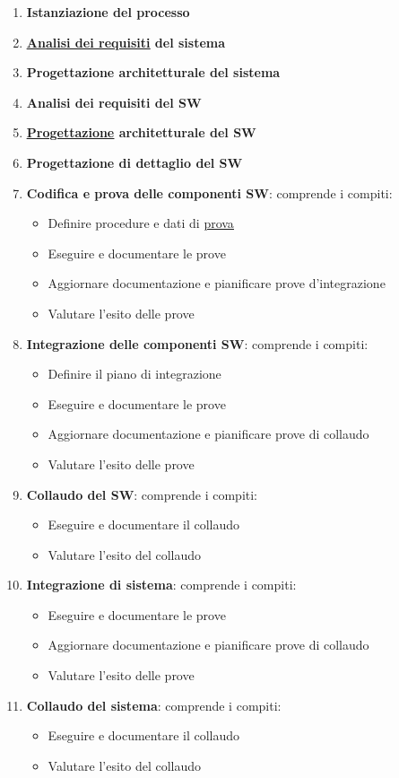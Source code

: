 			\begin{enumerate}
				\item \textbf{Istanziazione del processo}
				\item \textbf{\underline{\hyperref[analisideirequisiti]{Analisi dei requisiti}} del sistema}
				\item \textbf{Progettazione architetturale del sistema}
				\item \textbf{Analisi dei requisiti del SW}
				\item \textbf{\underline{\hyperref[progettazione]{Progettazione}} architetturale del SW}
				\item \textbf{Progettazione di dettaglio del SW}
				\item \textbf{Codifica e prova delle componenti SW}: comprende i compiti:
					\begin{itemize}
						\item Definire procedure e dati di \underline{\hyperref[prova]{prova}}
						\item Eseguire e documentare le prove
						\item Aggiornare documentazione e pianificare prove d’integrazione
						\item Valutare l’esito delle prove
					\end{itemize}
				\item \textbf{Integrazione delle componenti SW}: comprende i compiti:
					\begin{itemize}
						\item Definire il piano di integrazione
						\item Eseguire e documentare le prove
						\item Aggiornare documentazione e pianificare prove di collaudo
						\item Valutare l’esito delle prove
					\end{itemize}
				\item \textbf{Collaudo del SW}: comprende i compiti:
					\begin{itemize}
						\item Eseguire e documentare il collaudo
						\item Valutare l’esito del collaudo
					\end{itemize}
				\item \textbf{Integrazione di sistema}: comprende i compiti:
					\begin{itemize}
						\item Eseguire e documentare le prove
						\item Aggiornare documentazione e pianificare prove di collaudo
						\item Valutare l’esito delle prove
					\end{itemize}
				\item \textbf{Collaudo del sistema}: comprende i compiti:
					\begin{itemize}
						\item Eseguire e documentare il collaudo
						\item Valutare l’esito del collaudo
					\end{itemize}
			\end{enumerate}
